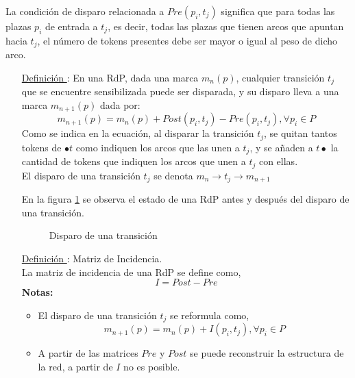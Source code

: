 La condición de disparo relacionada a $Pre(p_{i}, t_{j})$ significa que para
todas las plazas $p_{i}$ de entrada a $t_{j}$, es decir, todas las plazas que
tienen arcos que apuntan hacia $t_{j}$, el número de tokens presentes debe ser
mayor o igual al peso de dicho arco.

\begin{itemize}
  \item [\underline{Definición \thedefinitionsCounter}:] En una RdP, dada una marca $ m_{n}(p) $,
  cualquier transición $ t_{j} $ que se encuentre sensibilizada puede ser
  disparada, y su disparo lleva a una marca $ m_{n+1}(p)$ dada por:
  $$ m_{n+1}(p) = m_{n}(p) + Post(p_{i}, t_{j}) - Pre(p_{i}, t_{j}), \forall
  p_{i} \in P $$
  Como se indica en la ecuación, al disparar la transición $ t_{j} $, se quitan
  tantos tokens de $ \bullet t $ como indiquen los arcos que las unen a $ t_{j}
  $, y se añaden a $ t \bullet $ la cantidad de tokens que indiquen los arcos
  que unen a $ t_{j} $ con ellas.\\
  El disparo de una transición $ t_{j} $ se denota $ m_{n}\rightarrow t_{j}
  \rightarrow m_{n+1} $

  En la figura {\ref{fig:disparo_transicion}} se observa el estado de una RdP
  antes y después del disparo de una transición.
  \begin{figure}[h]
    \centering
    \caption{Disparo de una transición}
    \label{fig:disparo_transicion}
  \end{figure}
  
  \item [\underline{Definición \thedefinitionsCounter}:] Matriz de Incidencia.\\
  La matriz de incidencia de una RdP se define como,
  $$ I = Post - Pre $$
  \textbf{Notas:}
  \begin{itemize}
    \item El disparo de una transición $t_{j}$ se reformula como, $$ m_{n+1}(p)
    = m_{n}(p) + I(p_{i}, t_{j}), \forall p_{i} \in P $$
    \item A partir de las matrices $Pre$ y $Post$ se puede reconstruir la
    estructura de la red, a partir de $I$ no es posible.
  \end{itemize}
\end{itemize}

